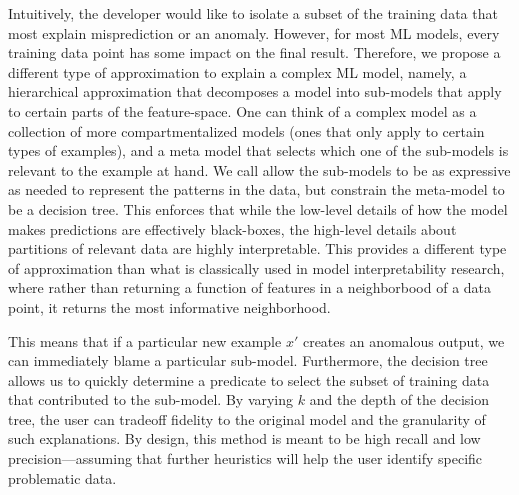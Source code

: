 Intuitively, the developer would like to isolate a subset of the training data that most explain misprediction or an anomaly. However, for most ML models, every training data point has some impact on the final result.
Therefore, we propose a different type of approximation to explain a complex ML model, namely, a hierarchical approximation that decomposes a model into sub-models that apply to certain parts of the feature-space.
One can think of a complex model as a collection of more compartmentalized models (ones that only apply to certain types of examples), and a meta model that selects which one of the sub-models is relevant to the example at hand.
We call allow the sub-models to be as expressive as needed to represent the patterns in the data, but constrain the meta-model to be a decision tree.
This enforces that while the low-level details of how the model makes predictions are effectively black-boxes, the high-level details about partitions of relevant data are highly interpretable.
This provides a different type of approximation than what is classically used in model interpretability research, where rather than returning a function of features in a neighborbood of a data point, it returns the most informative neighborhood.

This means that if a particular new example $x'$ creates an anomalous output, we can immediately blame a particular sub-model.
Furthermore, the decision tree allows us to quickly determine a predicate to select the subset of training data that contributed to the sub-model.
By varying $k$ and the depth of the decision tree, the user can tradeoff fidelity to the original model and the granularity of such explanations.
By design, this method is meant to be high recall and low precision---assuming that further heuristics will help the user identify specific problematic data.

